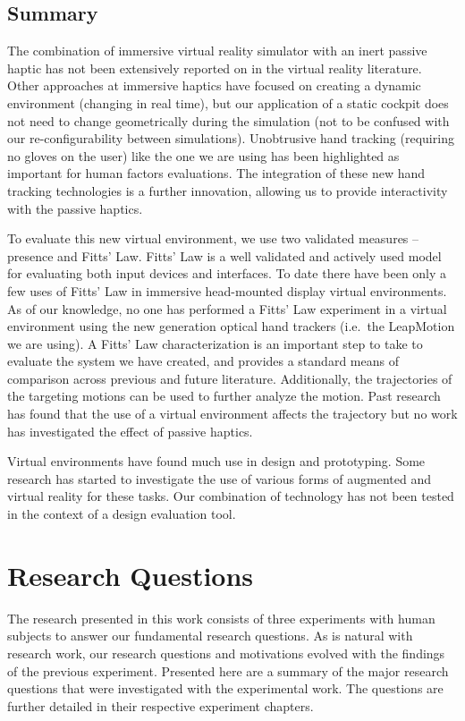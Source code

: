 \subsection{Summary}
\label{summary}

The combination of immersive virtual reality simulator with an inert passive haptic has not been extensively reported on in the virtual reality literature.
Other approaches at immersive haptics have focused on creating a dynamic environment (changing in real time), but our application of a static cockpit does not need to change geometrically during the simulation (not to be confused with our re-configurability between simulations).
Unobtrusive hand tracking (requiring no gloves on the user) like the one we are using has been highlighted as important for human factors evaluations.
The integration of these new hand tracking technologies is a further innovation, allowing us to provide interactivity with the passive haptics.

To evaluate this new virtual environment, we use two validated measures -- presence and Fitts' Law.
Fitts' Law is a well validated and actively used model for evaluating both input devices and interfaces.
To date there have been only a few uses of Fitts' Law in immersive head-mounted display virtual environments.
As of our knowledge, no one has performed a Fitts' Law experiment in a virtual environment using the new generation optical hand trackers (i.e.\ the LeapMotion we are using).
A Fitts' Law characterization is an important step to take to evaluate the system we have created, and provides a standard means of comparison across previous and future literature.
Additionally, the trajectories of the targeting motions can be used to further analyze the motion.
Past research has found that the use of a virtual environment affects the trajectory but no work has investigated the effect of passive haptics.

Virtual environments have found much use in design and prototyping.
Some research has started to investigate the use of various forms of augmented and virtual reality for these tasks.
Our combination of technology has not been tested in the context of a design evaluation tool.

\section{Research Questions}
\label{hypotheses}

The research presented in this work consists of three experiments with human subjects to answer our fundamental research questions.
As is natural with research work, our research questions and motivations evolved with the findings of the previous experiment.
Presented here are a summary of the major research questions that were investigated with the experimental work.
The questions are further detailed in their respective experiment chapters.

